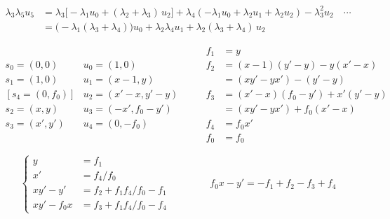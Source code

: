\documentclass[11pt,a4paper]{article}
\begin{document}
\[
\begin{aligned}
\lambda_3 \lambda_5 u_5 &= \lambda_3 \bigl[ -\lambda_1 u_0
 + (\lambda_2 + \lambda_3)\, u_2 \bigr]
 + \lambda_4 (-\lambda_1 u_0 + \lambda_2 u_1 + \lambda_2 u_2)
 - \lambda_3^2 u_2 \quad \cdots \\
 &= \bigl( -\lambda_1 (\lambda_3 + \lambda_4) \bigr) u_0
 + \lambda_2 \lambda_4 u_1 + \lambda_2 (\lambda_3 + \lambda_4)\, u_2
\end{aligned}
\]

\[
\begin{array}{ll}
s_0 = (0, 0) & u_0 = (1, 0) \\
s_1 = (1, 0) & u_1 = (x - 1, y) \\
{[s_4 = (0, f_0)]} & u_2 = (x' - x, y' - y) \\
s_2 = (x, y) & u_3 = (-x', f_0 - y') \\
s_3 = (x', y') & u_4 = (0, -f_0)
\end{array}
\qquad
\begin{aligned}
f_1 &= y \\
f_2 &= (x - 1)(y' - y) - y(x' - x) \\
 &= (xy' - yx') - (y' - y) \\
f_3 &= (x' - x)(f_0 - y') + x'(y' - y) \\
 &= (xy' - yx') + f_0 (x' - x) \\
f_4 &= f_0 x' \\
f_0 &= f_0
\end{aligned}
\]

\[
\left\lbrace
\begin{aligned}
y &= f_1 \\
x' &= f_4/f_0 \\
xy' - y' &= f_2 + f_1 f_4/f_0 - f_1 \\
xy' - f_0 x &= f_3 + f_1 f_4/f_0 - f_4
\end{aligned}
\right.
\qquad\qquad
f_0 x - y' = -f_1 + f_2 - f_3 + f_4
\]
\end{document}
